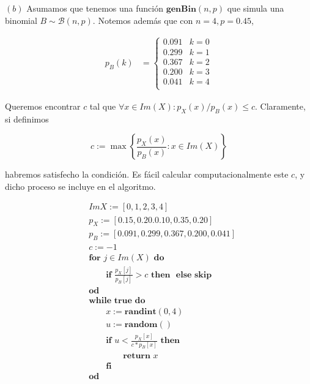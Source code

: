 \documentclass[a4paper, 12pt]{article}
\begin{document}
$(b)$ Asumamos que tenemos una función $\textbf{genBin}(n, p)$ que simula
una binomial $B \sim \mathcal{B}(n, p)$. Notemos además que con $n = 4,
p = 0.45$, 

\begin{align*}
  p_B(k) &= \begin{cases}
    0.091& k = 0\\ 
    0.299& k = 1\\ 
    0.367& k = 2\\ 
    0.200& k = 3\\ 
    0.041& k = 4\\
  \end{cases}
\end{align*}

Queremos encontrar $c$ tal que $\forall x \in Im(X) : p_X(x) / p_B(x) \leq c$.
Claramente, si definimos 

\begin{equation*}
  c := \max \left\{ \frac{p_X(x)}{p_B(x)} : x \in Im(X) \right\} 
\end{equation*}

habremos satisfecho la condición. Es fácil calcular computacionalmente este $c$,
y dicho proceso se incluye en el algoritmo. 


\begin{align*}
  &ImX := [0, 1, 2, 3, 4]\\
  &p_X := [0.15, 0.20. 0.10, 0.35, 0.20]\\
  &p_B := [0.091, 0.299, 0.367, 0.200, 0.041]\\
  &c := -1\\
  &\textbf{for } j \in Im(X) \textbf{ do }\\
  &\qquad \textbf{if } \frac{p_X[j]}{p_B[j]} > c \textbf{ then }  \textbf{ else
  } \textbf{skip}\\ 
  &\textbf{od} \\ 
  &\textbf{while true do} \\ 
  &\qquad x := \textbf{randint}(0, 4)\\ 
  &\qquad u := \textbf{random}() \\ 
  &\qquad \textbf{if } u < \frac{p_X[x]}{c * p_B[x]} \textbf{ then } \\ 
  &\qquad \qquad \textbf{return } x \\ 
  & \qquad\textbf{fi} \\ 
  &\textbf{od}
\end{align*}



\pagebreak 
\end{document}
